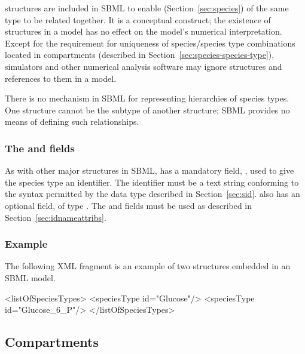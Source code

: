 \SpeciesType structures are included in SBML to enable \Species
(Section~\ref{sec:species}) of the same type to be related
together.  It is a conceptual construct; the existence of
\SpeciesType structures in a model has no effect on the model's
numerical interpretation.  Except for the requirement for
uniqueness of species/species type combinations located in
compartments (described in
Section~\ref{sec:species-species-type}), simulators and other
numerical analysis software may ignore \SpeciesType structures and
references to them in a model.

There is no mechanism in SBML for representing hierarchies of
species types.  One \SpeciesType structure cannot be the subtype
of another \SpeciesType structure; SBML provides no means of
defining such relationships.


\subsubsection{The  and  fields}

As with other major structures in SBML, \SpeciesType has a
mandatory field, , used to give the species type an
identifier.  The identifier must be a text string conforming to
the syntax permitted by the  data type described in
Section~\ref{sec:sid}.  \SpeciesType also has an optional
 field, of type .  The 
and  fields must be used as described in
Section~\ref{sec:idnameattribs}.

\subsubsection{Example}

The following XML fragment is an example of two
\SpeciesType structures embedded in an SBML model.

\begin{example}
<listOfSpeciesTypes>
    <speciesType id="Glucose"/>
    <speciesType id="Glucose_6_P"/>
</listOfSpeciesTypes>
\end{example}


\subsection{Compartments}
\label{sec:compartments}

